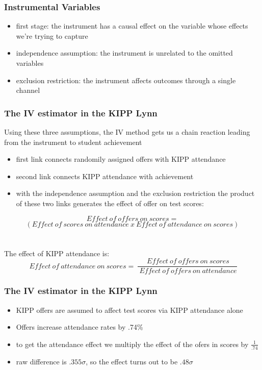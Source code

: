 \documentclass{beamer}
\begin{document}
\begin{frame}
\frametitle{Instrumental Variables}
\begin{itemize}
\item first stage: the instrument has a causal effect on the variable whose effects we're trying to capture
\item independence assumption: the instrument is unrelated to the omitted variables
\item exclusion restriction: the instrument affects outcomes through a single channel
\end{itemize}


\end{frame}
\begin{frame}
\frametitle{The IV estimator in the KIPP Lynn}
Using these three assumptions, the IV method gets us a chain reaction leading from the instrument to student achievement
\begin{itemize}
\item first link connects randomily assigned offers with KIPP attendance 
\item second link connects KIPP attendance with achievement
\item with the independence assumption and the exclusion restriction the product of these two links generates the effect of offer on test scores:
\end{itemize}
$$Effect~of~offers~on~scores = $$
$$(Effect~of~scores~on~attendance ~x~Effect~of~attendance ~on ~scores)$$ \\~\\

The effect of KIPP attendance is: $$~Effect ~of ~attendance ~on ~scores = ~\frac{~Effect ~of ~offers ~on ~scores}{~Effect ~of ~offers ~on ~attendance}$$

\end{frame}

\begin{frame}
\frametitle{The IV estimator in the KIPP Lynn}
\begin{itemize}
\item KIPP offers are assumed to affect test scores via KIPP attendance alone
\item Offers increase attendance rates by .74\%
\item to get the attendance effect we multiply the effect of the ofers in scores by $\frac{1}{.74}$
\item raw difference is $.355\sigma$, so the effect turns out to be $.48\sigma$
\end{itemize}
\end{frame}
\end{document}
